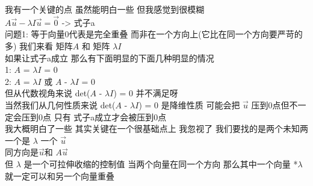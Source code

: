 \documentclass[12pt]{article}
\begin{document}
\begin{flushleft}
    我有一个关键的点 虽然能明白一些 但我感觉到很模糊 \\
    $A\vec{u} - \lambda I\vec{u} = \vec{0} $ -> 式子a \\
    问题1: 等于向量0代表是完全重叠 而非在一个方向上(它比在同一个方向要严苛的多)
    我们来看 矩阵$A$ 和 矩阵 $\lambda I$ \\
    如果让式子a成立 那么有下面明显的下面几种明显的情况 \\
    1: $A$ = $\lambda I$ = 0  \\
    2: $A$ = $\lambda I$ 或 $A$ - $\lambda I$  = 0  \\
    但从代数视角来说 det($A$ - $\lambda I$) = 0 并不满足呀 \\
    当然我们从几何性质来说 det($A$ - $\lambda I$) = 0 是降维性质 可能会把 $\vec{u}$ 压到0点但不一定会压到0点 只有 式子a成立才会被压到0点 \\

    我大概明白了一些 其实关键在一个很基础点上 我忽视了 我们要找的是两个未知两 一个是 $\lambda$ 一个  $\vec{u}$ \\
    同方向是$\vec{u}$和 $A\vec{u}$ \\
    但 $\lambda$ 是一个可拉伸收缩的控制值 当两个向量在同一个方向 那么其中一个向量 *$\lambda$ 就一定可以和另一个向量重叠 \\
\end{flushleft}
\end{document}
